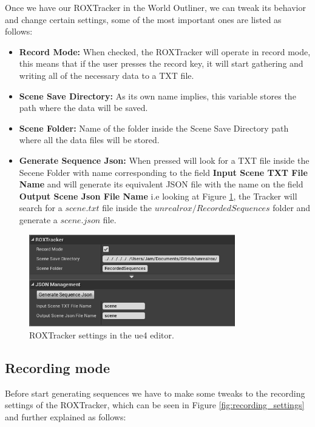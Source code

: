 Once we have our ROXTracker in the World Outliner, we can tweak its behavior and change certain settings, some of the most important ones are listed as follows:

\begin{itemize}
	\item \textbf{Record Mode:} When checked, the ROXTracker will operate in record mode, this means that if the user presses the record key, it will start gathering and writing all of the necessary data to a TXT file.
	\item \textbf{Scene Save Directory:} As its own name implies, this variable stores the path where the data will be saved.
	\item \textbf{Scene Folder:}  Name of the folder inside the Scene Save Directory path where all the data files will be stored.
	\item \textbf{Generate Sequence Json:} When pressed will look for a TXT file inside the Secene Folder with name corresponding to the field \textbf{Input Scene TXT File Name} and will generate its equivalent JSON file with the name on the field \textbf{Output Scene Json File Name} i.e looking at Figure \ref{fig:tracker_settings}, the Tracker will search for a $scene.txt$ file inside the $unrealrox/RecordedSequences$ folder and generate a $scene.json$ file.
\end{itemize}

\begin{figure}[h]
	\includegraphics[width=0.8\textwidth]{archivos/tracker_settings.png}
	\centering
	\caption{ROXTracker settings in the \gls{ue4} editor.}
	\label{fig:tracker_settings}
\end{figure}

\subsection{Recording mode}
\label{sec:recording}

Before start generating sequences we have to make some tweaks to the recording settings of the ROXTracker, which can be seen in Figure \ref{fig:recording_settings} and further explained as follows:

